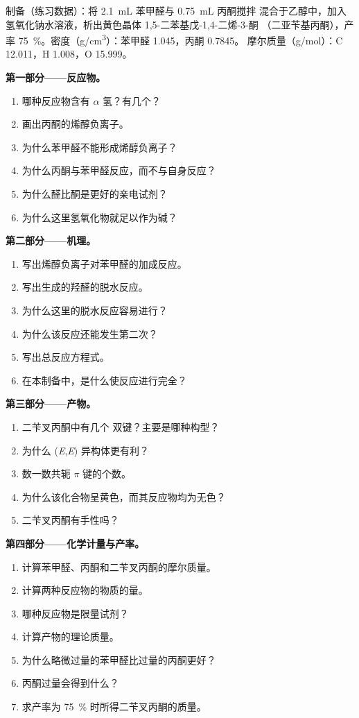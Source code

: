 \begin{problem}
\label{pb:b2:enolates-aldol:1}
制备（练习数据）：将 \qty{2.1}{mL} 苯甲醛与 \qty{0.75}{mL} 丙酮搅拌
混合于乙醇中，加入氢氧化钠水溶液，析出黄色晶体 1,5-二苯基戊-1,4-二烯-3-酮
（二亚苄基丙酮），产率 75~\%。密度（\unit{g/cm^3}）：苯甲醛 1.045，丙酮 0.7845。
摩尔质量（\unit{g/mol}）：C 12.011，H 1.008，O 15.999。

\medskip
\noindent\textbf{第一部分——反应物。}
\begin{enumerate}
  \item 哪种反应物含有 $\alpha$ 氢？有几个？
  \item 画出丙酮的烯醇负离子。
  \item 为什么苯甲醛不能形成烯醇负离子？
  \item 为什么丙酮与苯甲醛反应，而不与自身反应？
  \item 为什么醛比酮是更好的亲电试剂？
  \item 为什么这里氢氧化物就足以作为碱？
\end{enumerate}

\medskip
\noindent\textbf{第二部分——机理。}
\begin{enumerate}[resume]
  \item 写出烯醇负离子对苯甲醛的加成反应。
  \item 写出生成的羟醛的脱水反应。
  \item 为什么这里的脱水反应容易进行？
  \item 为什么该反应还能发生第二次？
  \item 写出总反应方程式。
  \item 在本制备中，是什么使反应进行完全？
\end{enumerate}

\medskip
\noindent\textbf{第三部分——产物。}
\begin{enumerate}[resume]
  \item 二苄叉丙酮中有几个  双键？主要是哪种构型？
  \item 为什么 (\textit{E},\textit{E}) 异构体更有利？
  \item 数一数共轭 $\pi$ 键的个数。
  \item 为什么该化合物呈黄色，而其反应物均为无色？
  \item 二苄叉丙酮有手性吗？
\end{enumerate}

\medskip
\noindent\textbf{第四部分——化学计量与产率。}
\begin{enumerate}[resume]
  \item 计算苯甲醛、丙酮和二苄叉丙酮的摩尔质量。
  \item 计算两种反应物的物质的量。
  \item 哪种反应物是限量试剂？
  \item 计算产物的理论质量。
  \item 为什么略微过量的苯甲醛比过量的丙酮更好？
  \item 丙酮过量会得到什么？
  \item 求产率为 75~\% 时所得二苄叉丙酮的质量。
\end{enumerate}
\end{problem}
